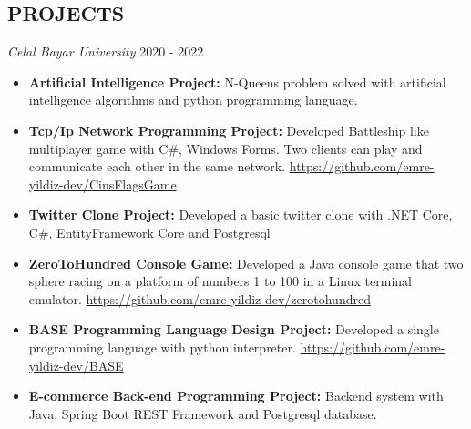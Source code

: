 \documentclass[line,margin]{res}
\begin{document}
\begin{resume}
\section{PROJECTS}{\sl Celal Bayar University} \hfill        2020 - 2022 \\
                  \begin{itemize}
                   \item \textbf{Artificial Intelligence Project: } N-Queens problem solved with artificial intelligence algorithms and python programming language. 
                   \item \textbf{Tcp/Ip Network Programming Project: } Developed Battleship like multiplayer game with C\#, Windows Forms. Two clients can play and communicate each other in the same network. \href{https://github.com/emre-yildiz-dev/CinsFlagsGame}{https://github.com/emre-yildiz-dev/CinsFlagsGame}
                   \item \textbf{Twitter Clone Project: } Developed a basic twitter clone with .NET Core, C\#, EntityFramework Core and Postgresql
                    \item \textbf{ZeroToHundred Console Game: } Developed a Java console game that two sphere racing on a platform of numbers 1 to 100 in a Linux terminal emulator. \href{https://github.com/emre-yildiz-dev/zerotohundred}{https://github.com/emre-yildiz-dev/zerotohundred} 
                     \item \textbf{BASE Programming Language Design Project: } Developed a single programming language with python interpreter. \href{https://github.com/emre-yildiz-dev/BASE}{https://github.com/emre-yildiz-dev/BASE}
                     \item \textbf{E-commerce Back-end Programming Project: } Backend system with Java, Spring Boot REST Framework and Postgresql database.
                      

\end{itemize}
\end{resume}
\end{document}

